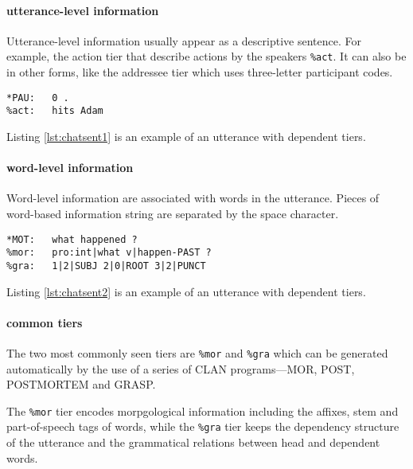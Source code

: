 \paragraph{utterance-level information}
Utterance-level information usually appear as a descriptive sentence. For example, the action tier that describe actions by the speakers \texttt{\%act}. It can also be in other forms, like the addressee tier which uses three-letter participant codes.\\

\lstset{
numbers = none,
frame = single,
}

\begin{lstlisting}[caption={Excerpt from Adam/040217.cha of the Brown Corpus (\cite{brown1973})}, label={lst:chatsent1}]
*PAU:	0 .
%act:	hits Adam
\end{lstlisting}

Listing \ref{lst:chatsent1} is an example of an utterance with dependent tiers.\\


\paragraph{word-level information}
Word-level information are associated with words in the utterance. Pieces of word-based information string are separated by the space character.\\

\lstset{
numbers = none,
frame = single,
}

\begin{lstlisting}[caption={Excerpt from Adam/040217.cha of the Brown Corpus (\cite{brown1973})}, label={lst:chatsent2}]
*MOT:	what happened ?
%mor:	pro:int|what v|happen-PAST ?
%gra:	1|2|SUBJ 2|0|ROOT 3|2|PUNCT
\end{lstlisting}

Listing \ref{lst:chatsent2} is an example of an utterance with dependent tiers.\\

\paragraph{common tiers}
The two most commonly seen tiers are \texttt{\%mor} and \texttt{\%gra} which can be generated automatically by the use of a series of CLAN programs---MOR, POST, POSTMORTEM and GRASP.

The \texttt{\%mor} tier encodes morpgological information including the affixes, stem and part-of-speech tags of words, while the \texttt{\%gra} tier keeps the dependency structure of the utterance and the grammatical relations between head and dependent words.

